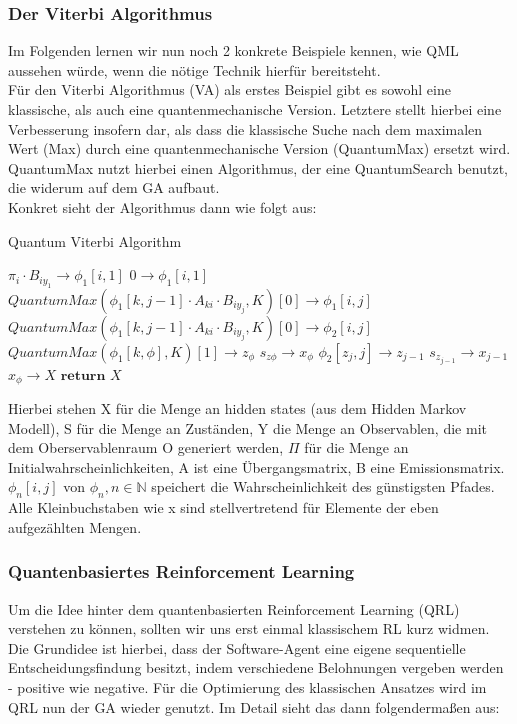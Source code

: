 \subsubsection{Der Viterbi Algorithmus}
Im Folgenden lernen wir nun noch 2 konkrete Beispiele kennen, wie QML aussehen würde, wenn die nötige Technik hierfür bereitsteht.\\

Für den Viterbi Algorithmus (VA) als erstes Beispiel gibt es sowohl eine klassische, als auch eine quantenmechanische Version. Letztere stellt hierbei eine Verbesserung insofern dar, als dass die klassische Suche nach dem maximalen Wert (Max) durch eine quantenmechanische Version (QuantumMax) ersetzt wird. QuantumMax nutzt hierbei einen Algorithmus, der eine QuantumSearch benutzt, die widerum auf dem GA aufbaut\cite{RuntimeOptiBishwas}.\\
Konkret sieht der Algorithmus dann wie folgt aus:

\begin{algorithm}
\caption{Quantum Viterbi Algorithm \cite{RuntimeOptiBishwas2}}
\begin{algorithmic}[1]
\State $\pi_i \cdot B_{iy_1} \to \phi_1[i,1]$
\State $0 \to \phi_1[i,1]$
\EndFor
{}
\State $\textit{QuantumMax}(\phi_1[k,j-1] \cdot A_{ki} \cdot B_{iy_j},K)[0] \to \phi_1[i,j]$
\State $\textit{QuantumMax}(\phi_1[k,j-1] \cdot A_{ki} \cdot B_{iy_j},K)[0] \to \phi_2[i,j]$
\EndFor
\EndFor
\State $QuantumMax(\phi_1[k,\phi],K)[1] \to z_{\phi}$
\State $s_{z\phi} \to x_{\phi}$
\State $\phi_2[z_j,j] \to z_{j-1}$
\State $s_{z_{j-1}} \to x_{j-1}$
\EndFor
\State $x_{\phi} \to X$
\State $\textbf{return }X$
\EndProcedure
\end{algorithmic}
\end{algorithm}
Hierbei stehen X für die Menge an hidden states (aus dem Hidden Markov Modell), S für die Menge an Zuständen, Y die Menge an Observablen, die mit dem Oberservablenraum O generiert werden, $\Pi$ für die Menge an Initialwahrscheinlichkeiten, A ist eine Übergangsmatrix, B eine Emissionsmatrix. $\phi_n[i,j]$ von $\phi_n, n \in \mathbb{N}$ speichert die Wahrscheinlichkeit des günstigsten Pfades. Alle Kleinbuchstaben wie x sind stellvertretend für Elemente der eben aufgezählten Mengen\cite{RuntimeOptiBishwas2}.
\newpage
\subsubsection{Quantenbasiertes Reinforcement Learning}
Um die Idee hinter dem quantenbasierten Reinforcement Learning (QRL) verstehen zu können, sollten wir uns erst einmal klassischem RL kurz widmen. Die Grundidee ist hierbei, dass der Software-Agent eine eigene sequentielle Entscheidungsfindung besitzt, indem verschiedene Belohnungen vergeben werden - positive wie negative\cite{IntroDeepReinfLavet}.
Für die Optimierung des klassischen Ansatzes wird im QRL nun der GA wieder genutzt. Im Detail sieht das dann folgendermaßen aus:\\

